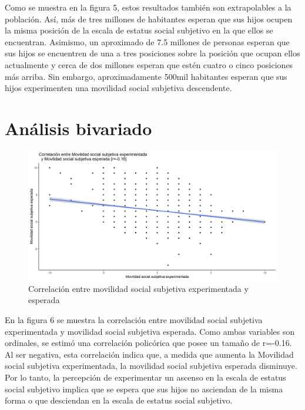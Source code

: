 \documentclass[
]{article}
\begin{document}
Como se muestra en la figura 5, estos resultados también son
extrapolables a la población. Así, más de tres millones de habitantes
esperan que sus hijos ocupen la misma posición de la escala de estatus
social subjetivo en la que ellos se encuentran. Asimismo, un aproximado
de 7.5 millones de personas esperan que sus hijos se encuentren de una a
tres posiciones sobre la posición que ocupan ellos actualmente y cerca
de dos millones esperan que estén cuatro o cinco posiciones más arriba.
Sin embargo, aproximadamente 500mil habitantes esperan que sus hijos
experimenten una movilidad social subjetiva descendente.

\hypertarget{anuxe1lisis-bivariado}{%
\section{Análisis bivariado}\label{anuxe1lisis-bivariado}}

\begin{figure}

{\centering \includegraphics[width=0.8\linewidth,height=0.8\textheight]{output/graphs/graf8} 

}

\caption{Correlación entre movilidad social subjetiva experimentada y esperada}\label{fig:unnamed-chunk-11}
\end{figure}

En la figura 6 se muestra la correlación entre movilidad social
subjetiva experimentada y movilidad social subjetiva esperada. Como
ambas variables son ordinales, se estimó una correlación policórica que
posee un tamaño de r=-0.16. Al ser negativa, esta correlación indica
que, a medida que aumenta la Movilidad social subjetiva experimentada,
la movilidad social subjetiva esperada disminuye. Por lo tanto, la
percepción de experimentar un ascenso en la escala de estatus social
subjetivo implica que se espera que sus hijos no asciendan de la misma
forma o que desciendan en la escala de estatus social subjetivo.
\end{document}
